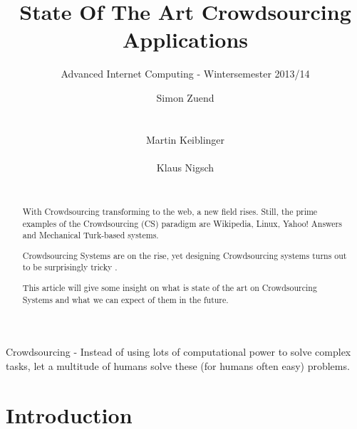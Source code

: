 \documentclass{sig-alternate}
\begin{document}
\title{State Of The Art Crowdsourcing Applications
}
\subtitle{Advanced Internet Computing - Wintersemester 2013/14
}

\author{
\alignauthor
Simon Zuend\\
       \\
       \\
\alignauthor
Martin Keiblinger\\
       \\
\alignauthor
Klaus Nigsch\\
       \\
}

\maketitle
\begin{abstract}

With Crowdsourcing transforming to the web, a new field rises. \cite{cswww}
Still, the prime examples of the Crowdsourcing (CS) paradigm are Wikipedia, 
Linux, Yahoo! Answers and Mechanical Turk-based systems.

Crowdsourcing Systems are on the rise, yet designing Crowdsourcing systems turns out to be
surprisingly tricky \cite{cswww}.

This article will give some insight on what is state of the art on Crowdsourcing Systems and
what we can expect of them in the future. 

\end{abstract}


Crowdsourcing - Instead of using lots of computational power to solve complex tasks, let a multitude of humans solve these (for humans often easy) problems.


\section{Introduction}
\end{document}
